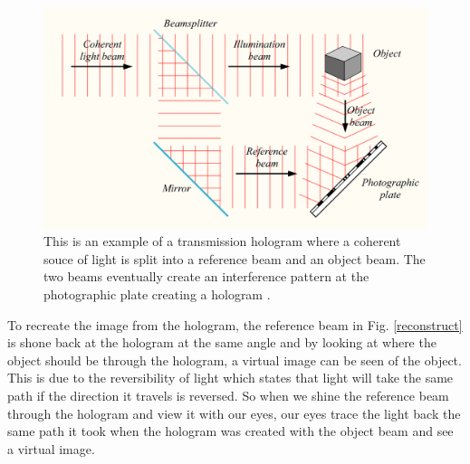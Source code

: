 \documentclass[ notitlepage, numerical, 11pt]{revtex4-1} %
\begin{document}
\begin{figure}[H]
\centerline{\includegraphics[scale=.45]{create.png}}
\caption{This is an example of a transmission hologram where a coherent souce of light is split into a reference beam and an object beam. The two beams eventually create an interference pattern at the photographic plate creating a hologram \cite{HDS}.}
\label{create}
\end{figure} 

 To recreate the image from the hologram, the reference beam in Fig. \ref{reconstruct} is shone back at the hologram at the same angle and by looking at where the object should be through the hologram, a virtual image can be seen of the object. This is due to the reversibility of light which states that light will take the same path if the direction it travels is reversed. So when we shine the reference beam through the hologram and view it with our eyes, our eyes trace the light back the same path it took when the hologram was created with the object beam and see a virtual image.
\end{document}
